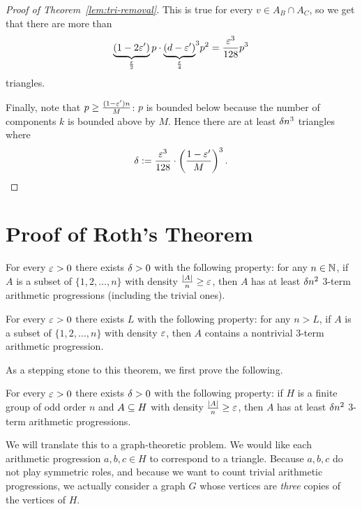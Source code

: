 \begin{proof}[Proof of Theorem~\ref{lem:tri-removal}]

This is true for every $v\in A_B\cap A_C$, so we get that there are more than
\[
\underbrace{(1-2\varepsilon')}_{\frac{\varepsilon}{2}}p\cdot{\underbrace{(d-\varepsilon')}_{\frac{\varepsilon}{4}}}^3p^2
=\frac{\varepsilon^3}{128}p^3
\]
triangles.

Finally, note that $p\ge \frac{(1-\varepsilon')n}{M}$: $p$ is bounded below because the number of components $k$ is bounded above by $M$. Hence there are at least $\delta n^3$ triangles where
\[
\delta:=\frac{\varepsilon^3}{128}\cdot \left( {\frac{1-\varepsilon'}{M}} \right)^3.
\]
\end{proof}

\section{Proof of Roth's Theorem}

\begin{thm}
For every $\varepsilon>0$ there exists $\delta>0$ with the following property: for any $n\in \mathbb{N}$, if $A$ is a subset of $\{1,2,\ldots, n\}$ with density $\frac{|A|}{n}\ge \varepsilon$, then $A$ has at least $\delta n^2$ 3-term arithmetic progressions (including the trivial ones).
\end{thm}
\begin{cor}
For every $\varepsilon>0$ there exists $L$ with the following property: for any $n>L$, if $A$ is a subset of $\{1,2,\ldots, n\}$ with density $\varepsilon$, then $A$ contains a nontrivial 3-term arithmetic progression. 
\end{cor}

As a stepping stone to this theorem, we first prove the following.

\begin{thm}
For every $\varepsilon>0$ there exists $\delta>0$ with the following property: if $H$ is a finite group of odd order $n$ and $A\subseteq H$ with density $\frac{|A|}{n}\ge \varepsilon$, then $A$ has at least $\delta n^2$ 3-term arithmetic progressions.
\end{thm}

We will translate this to a graph-theoretic problem. We would like each arithmetic progression $a,b,c\in H$ to correspond to a triangle. Because $a,b,c$ do not play symmetric roles, and because we want to count trivial arithmetic progressions, we actually consider a graph $G$ whose vertices are {\it three} copies of the vertices of $H$.

